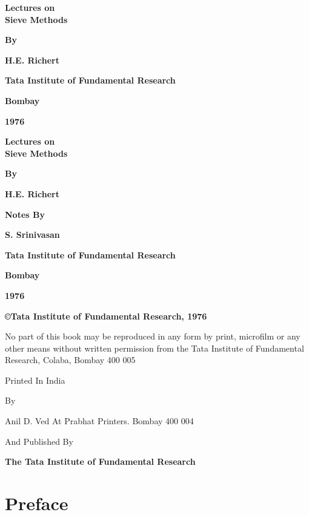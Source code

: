 \thispagestyle{empty}

\begin{center}
{\Large\bf Lectures on}\\[5pt]
{\Large\bf Sieve Methods}
\vskip 1cm

{\bf By}
\medskip

{\large\bf H.E. Richert}
\vfill

{\bf Tata Institute of Fundamental Research}


{\bf Bombay}

{\bf 1976}

\end{center}
\eject


\thispagestyle{empty}
\begin{center}
{\Large\bf Lectures on}\\[5pt]
{\Large\bf Sieve Methods}
\vskip 1cm

{\bf By}
\medskip

{\large\bf H.E. Richert}
\vfill

{\bf Notes By}
\medskip

{\large\bf S. Srinivasan}
\vfill

{\bf Tata Institute of Fundamental Research}


{\bf Bombay}


{\bf 1976}

\end{center}
\eject


\thispagestyle{empty}

\begin{center}

\vfill
{\bf\copyright Tata Institute of Fundamental Research, 1976}
\vfill

\parbox{0.7\textwidth}{No part of this book may be reproduced
in any form by print, microfilm or any
other means without written permission
from the Tata Institute of Fundamental
Research, Colaba, Bombay 400 005}
\vfill

Printed In India

By

Anil D. Ved At Prabhat Printers. Bombay 400 004

And Published By

{\bf The Tata Institute of Fundamental Research}
\end{center}

\chapter{Preface}


